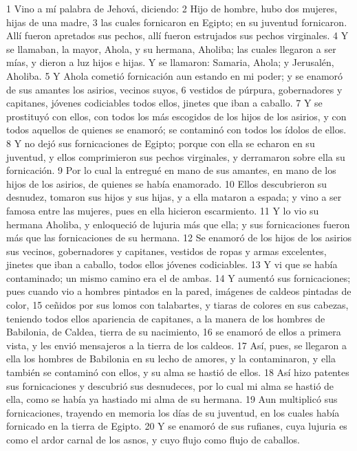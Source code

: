1 Vino a mí palabra de Jehová, diciendo:
2 Hijo de hombre, hubo dos mujeres, hijas de una madre,
3 las cuales fornicaron en Egipto; en su juventud fornicaron. Allí fueron apretados sus pechos, allí fueron estrujados sus pechos virginales.
4 Y se llamaban, la mayor, Ahola, y su hermana, Aholiba; las cuales llegaron a ser mías, y dieron a luz hijos e hijas. Y se llamaron: Samaria, Ahola; y Jerusalén, Aholiba.
5 Y Ahola cometió fornicación aun estando en mi poder; y se enamoró de sus amantes los asirios, vecinos suyos,
6 vestidos de púrpura, gobernadores y capitanes, jóvenes codiciables todos ellos, jinetes que iban a caballo.
7 Y se prostituyó con ellos, con todos los más escogidos de los hijos de los asirios, y con todos aquellos de quienes se enamoró; se contaminó con todos los ídolos de ellos. 
8 Y no dejó sus fornicaciones de Egipto; porque con ella se echaron en su juventud, y ellos comprimieron sus pechos virginales, y derramaron sobre ella su fornicación.
9 Por lo cual la entregué en mano de sus amantes, en mano de los hijos de los asirios, de quienes se había enamorado.
10 Ellos descubrieron su desnudez, tomaron sus hijos y sus hijas, y a ella mataron a espada; y vino a ser famosa entre las mujeres, pues en ella hicieron escarmiento.
11 Y lo vio su hermana Aholiba, y enloqueció de lujuria más que ella; y sus fornicaciones fueron más que las fornicaciones de su hermana.
12 Se enamoró de los hijos de los asirios sus vecinos, gobernadores y capitanes, vestidos de ropas y armas excelentes, jinetes que iban a caballo, todos ellos jóvenes codiciables.
13 Y vi que se había contaminado; un mismo camino era el de ambas.
14 Y aumentó sus fornicaciones; pues cuando vio a hombres pintados en la pared, imágenes de caldeos pintadas de color,
15 ceñidos por sus lomos con talabartes, y tiaras de colores en sus cabezas, teniendo todos ellos apariencia de capitanes, a la manera de los hombres de Babilonia, de Caldea, tierra de su nacimiento,
16 se enamoró de ellos a primera vista, y les envió mensajeros a la tierra de los caldeos.
17 Así, pues, se llegaron a ella los hombres de Babilonia en su lecho de amores, y la contaminaron, y ella también se contaminó con ellos, y su alma se hastió de ellos.
18 Así hizo patentes sus fornicaciones y descubrió sus desnudeces, por lo cual mi alma se hastió de ella, como se había ya hastiado mi alma de su hermana.
19 Aun multiplicó sus fornicaciones, trayendo en memoria los días de su juventud, en los cuales había fornicado en la tierra de Egipto.
20 Y se enamoró de sus rufianes, cuya lujuria es como el ardor carnal de los asnos, y cuyo flujo como flujo de caballos.
